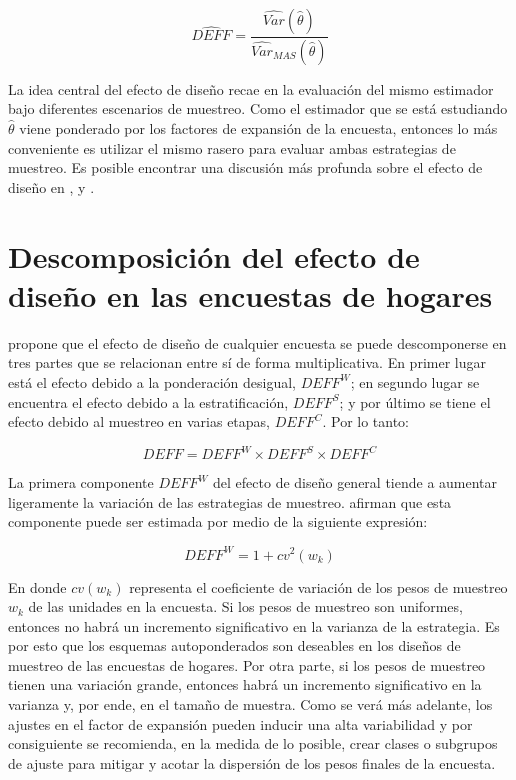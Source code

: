 \documentclass[
  12pt,
]{book}
\begin{document}
\[
\widehat{DEFF} = \frac{\widehat{Var}(\hat\theta)}{\widehat{Var}_{MAS}(\hat{\theta})}
\]

La idea central del efecto de diseño recae en la evaluación del mismo estimador bajo diferentes escenarios de muestreo. Como el estimador que se está estudiando \(\hat \theta\) viene ponderado por los factores de expansión de la encuesta, entonces lo más conveniente es utilizar el mismo rasero para evaluar ambas estrategias de muestreo. Es posible encontrar una discusión más profunda sobre el efecto de diseño en \citet[sección 4.]{Gambino_2009}, \citet[página 188]{Sarndal_Swensson_Wretman_2003} y \citet[página 101]{Gutierrez_Zhang_Montano_2016}.

\hypertarget{descomposiciuxf3n-del-efecto-de-diseuxf1o-en-las-encuestas-de-hogares}{%
\section{Descomposición del efecto de diseño en las encuestas de hogares}\label{descomposiciuxf3n-del-efecto-de-diseuxf1o-en-las-encuestas-de-hogares}}

\citet{Park_2003} propone que el efecto de diseño de cualquier encuesta se puede descomponerse en tres partes que se relacionan entre sí de forma multiplicativa. En primer lugar está el efecto debido a la ponderación desigual, \(DEFF^W\); en segundo lugar se encuentra el efecto debido a la estratificación, \(DEFF^S\); y por último se tiene el efecto debido al muestreo en varias etapas, \(DEFF^C\). Por lo tanto:

\[
DEFF = DEFF^W \times DEFF^S \times DEFF^C
\]

La primera componente \(DEFF^W\) del efecto de diseño general tiende a aumentar ligeramente la variación de las estrategias de muestreo. \citet{Valliant_Dever_Kreuter_2018} afirman que esta componente puede ser estimada por medio de la siguiente expresión:

\[
DEFF^W = 1 + cv^2(w_k)
\]

En donde \(cv(w_k)\) representa el coeficiente de variación de los pesos de muestreo \(w_k\) de las unidades en la encuesta. Si los pesos de muestreo son uniformes, entonces no habrá un incremento significativo en la varianza de la estrategia. Es por esto que los esquemas autoponderados son deseables en los diseños de muestreo de las encuestas de hogares. Por otra parte, si los pesos de muestreo tienen una variación grande, entonces habrá un incremento significativo en la varianza y, por ende, en el tamaño de muestra. Como se verá más adelante, los ajustes en el factor de expansión pueden inducir una alta variabilidad y por consiguiente se recomienda, en la medida de lo posible, crear clases o subgrupos de ajuste para mitigar y acotar la dispersión de los pesos finales de la encuesta.
\end{document}
